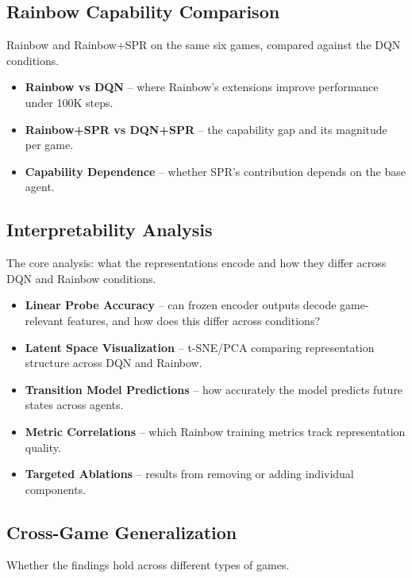\documentclass[11pt]{article}
\begin{document}
\subsection{Rainbow Capability Comparison}

\noindent Rainbow and Rainbow+SPR on the same six games, compared
against the DQN conditions.

\begin{itemize}
\item \textbf{Rainbow vs DQN} -- where Rainbow's extensions
  improve performance under 100K steps.
\item \textbf{Rainbow+SPR vs DQN+SPR} -- the capability gap and
  its magnitude per game.
\item \textbf{Capability Dependence} -- whether SPR's contribution
  depends on the base agent.
\end{itemize}

\subsection{Interpretability Analysis}

\noindent The core analysis: what the representations encode and how
they differ across DQN and Rainbow conditions.

\begin{itemize}
\item \textbf{Linear Probe Accuracy} -- can frozen encoder outputs
  decode game-relevant features, and how does this differ across
  conditions?
\item \textbf{Latent Space Visualization} -- t-SNE/PCA comparing
  representation structure across DQN and Rainbow.
\item \textbf{Transition Model Predictions} -- how accurately the
  model predicts future states across agents.
\item \textbf{Metric Correlations} -- which Rainbow training
  metrics track representation quality.
\item \textbf{Targeted Ablations} -- results from removing or
  adding individual components.
\end{itemize}

\subsection{Cross-Game Generalization}

\noindent Whether the findings hold across different types of games.
\end{document}
